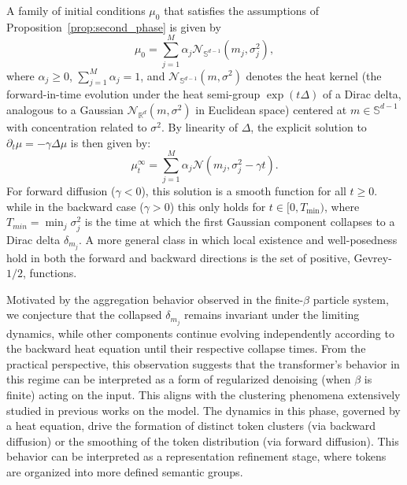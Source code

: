 \documentclass{article}
\numberwithin{theorem}{section}
\begin{document}
 A family of initial conditions $\mu_0$ that satisfies the assumptions of Proposition~\ref{prop:second_phase} is given by
$$ \mu_0 = \sum_{j=1}^M \alpha_j \mathcal{N}_{\mathbb{S}^{d-1}}(m_j,\sigma_j^2), $$
where $\alpha_j\geq0$, $\sum_{j=1}^M \alpha_j=1$, and $\mathcal{N}_{\mathbb{S}^{d-1}}(m, \sigma^2)$ denotes the heat kernel (the forward-in-time evolution under the heat semi-group $\exp(t  \Delta)$ of a Dirac delta, analogous to a Gaussian $\mathcal{N}_{\mathbb{R}^d}(m, \sigma^2)$ in Euclidean space) centered at $m \in \mathbb{S}^{d-1}$ with concentration related to $\sigma^2$. 
By linearity of $\Delta$, the explicit solution to $\partial_t \mu = -\gamma \Delta \mu$ is then given by:
\begin{equation}
\label{eq:gaussian_mixture}
 \mu_t^\infty = \sum_{j=1}^M \alpha_j \mathcal{N}(m_j, \sigma_j^2 - \gamma t). 
\end{equation}
For forward diffusion ($\gamma < 0$), this solution is a smooth function for all $t \geq 0$.
while in the backward case ($\gamma > 0$) this only holds for $t \in [0, T_{\min})$, where $T_{min} = 
\min_{j} \sigma_j^2$ is the time at which the first Gaussian component collapses to a Dirac delta $\delta_{m_j}$.
A more general class in which local existence and well-posedness hold in both the forward and backward directions is the set of positive, Gevrey-$1/2$, functions.


Motivated by the aggregation behavior observed in the finite-$\beta$ particle system, we conjecture that the collapsed $\delta_{m_j}$ remains invariant under the limiting dynamics, while other components continue evolving independently according to the backward heat equation until their respective collapse times.
From the practical perspective, this observation suggests that the transformer’s behavior in this regime can be interpreted as a form of regularized denoising (when $\beta$ is finite) acting on the input. This aligns with the clustering phenomena extensively studied in previous works on the model. The dynamics in this phase, governed by a heat equation, drive the formation of distinct token clusters (via backward diffusion) or the smoothing of the token distribution (via forward diffusion).
This behavior can be interpreted as a representation refinement stage, where tokens are organized into more defined semantic groups.
\end{document}

